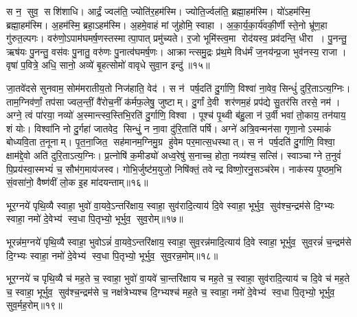 स न॒ सुव॒ सशि॑शाधि। आर्द्रं॒ ज्वल॑ति॒ ज्योति॑र॒हम॑स्मि। ज्योति॒र्ज्वल॑ति॒ ब्रह्मा॒हम॑स्मि। यो॑ऽहम॑स्मि॒ ब्रह्मा॒हम॑स्मि। अ॒हम॑स्मि॒ ब्रहा॒ऽहम॑स्मि। अ॒हमे॒वाहं मां जु॑होमि॒ स्वाहा। अ॒का॒र्य॒का॒र्य॑वकी॒र्णी स्ते॒नो भ्रू॑ण॒हा गु॑रुत॒ल्पगः। वरु॑णो॒ऽपाम॑घ\-मर्\mbox{}ष॒णस्तस्मात्पा॒पात् प्रमु॑च्यते। र॒जो भूमि॑स्त्व॒मा रोद॑यस्व॒ प्रव॑दन्ति॒ धीरा। पु॒नन्तु॒ ऋष॑यः पु॒नन्तु॒ वस॑वः पु॒नातु॒ वरु॑णः पु॒नात्व॑घमर्\mbox{}ष॒णः। आक्रान्त्समु॒द्रः प्र॑थ॒मे विध॑र्मं ज॒नय॑न्प्र॒जा भुव॑नस्य॒ राजा। वृषा॑ प॒वित्रे॒ अधि॒ सानो॒ अव्ये॑ बृ॒हत्सोमो॑ वावृधे सुवा॒न इन्दु॑॥१५॥
\anuvakamend

 जा॒तवे॑दसे सुनवाम॒ सोम॑मरातीय॒तो निज॑हाति॒ वेद॑। स न॑ पर्\mbox{}ष॒दति॑ दु॒र्गाणि॒ विश्वा॑ ना॒वेव॒ सिन्धुं॑ दुरि॒ताऽत्य॒ग्निः। ताम॒ग्निव॑र्णां॒ तप॑सा ज्वल॒न्तीं॒ वै॑रोच॒नीं क॑र्मफ॒लेषु॒ जुष्टाम्। दु॒र्गां दे॒वी शर॑णम॒हं प्रप॑द्ये सु॒तर॑सि तरसे॒ नम॑। अग्ने॒ त्वं पा॑रया॒ नव्यो॑ अ॒स्मान्त्स्व॒स्तिभि॒रति॑ दु॒र्गाणि॒ विश्वा। पूश्च॑ पृ॒थ्वी ब॑हु॒ला न॑ उ॒र्वी भवा॑ तो॒काय॒ तन॑याय॒ शं योः। विश्वा॑नि नो दु॒र्गहा॑ जातवेद॒ सिन्धुं॒ न ना॒वा दु॑रि॒ताति॑ पर्\mbox{}षि। अग्ने॑ अत्रि॒वन्मन॑सा गृणा॒नोऽस्माकं॑ बोध्यवि॒ता त॒नूनाम्। पृ॒त॒ना॒जित॒ सह॑मानम॒ग्निमु॒ग्र हु॑वेम पर॒मात्स॒धस्थात्। स न॑ पर्\mbox{}ष॒दति॑ दु॒र्गाणि॒ विश्वा॒ क्षाम॑द्दे॒वो अति॑ दुरि॒ताऽत्य॒ग्निः। प्र॒त्नोषि॑ क॒मीड्यो॑ अध्व॒रेषु॑ स॒नाच्च॒ होता॒ नव्य॑श्च॒ सत्सि॑। स्वाञ्चाग्ने त॒नुवं॑ पि॒प्रय॑स्वा॒स्मभ्यं॑ च॒ सौभ॑ग॒माय॑जस्व। गोभि॒र्जुष्ट॑म॒युजो॒ निषि॑क्तं॒ तवेन्द्र विष्णो॒रनु॒सञ्च॑रेम। नाक॑स्य पृ॒ष्ठम॒भि सं॒वसा॑नो॒ वैष्ण॑वीं लो॒क इ॒ह मा॑दयन्ताम्॥१६॥
\anuvakamend%


भूर॒ग्नये॑ पृथि॒व्यै स्वाहा॒ भुवो॑ वा॒यवे॒ऽन्तरि॑क्षाय॒ स्वाहा॒ सुव॑रादि॒त्याय॑ दि॒वे स्वाहा॒ भूर्भुव॒ सुव॑श्च॒न्द्रम॑से दि॒ग्भ्यः स्वाहा॒ नमो॑ दे॒वेभ्य॑ स्व॒धा पि॒तृभ्यो॒ भूर्भुव॒ सुव॒रोम्॥१७॥
\anuvakamend


भूरन्न॑म॒ग्नये॑ पृथि॒व्यै स्वाहा॒ भुवोऽन्नं॑ वा॒यवे॒ऽन्तरि॑क्षाय॒ स्वाहा॒ सुव॒रन्न॑मादि॒त्याय॑ दि॒वे स्वाहा॒ भूर्भुव॒ सुव॒रन्नं॑ च॒न्द्रम॑से दि॒ग्भ्यः स्वाहा॒ नमो॑ दे॒वेभ्य॑ स्व॒धा पि॒तृभ्यो॒ भूर्भुव॒ सुव॒रन्न॒मोम्॥१८॥
\anuvakamend


भूर॒ग्नये॑ च पृथि॒व्यै च॑ मह॒ते च॒ स्वाहा॒ भुवो॑ वा॒यवे॑ चा॒न्तरि॑क्षाय च मह॒ते च॒ स्वाहा॒ सुव॑रादि॒त्याय॑ च दि॒वे च॑ मह॒ते च॒ स्वाहा॒ भूर्भुव॒ सुव॑श्च॒न्द्रम॑से च॒ नक्ष॑त्रेभ्यश्च दि॒ग्भ्यश्च॑ मह॒ते च॒ स्वाहा॒ नमो॑ दे॒वेभ्य॑ स्व॒धा पि॒तृभ्यो॒ भूर्भुव॒ सुव॒र्मह॒रोम्॥१९॥ %
\anuvakamend

